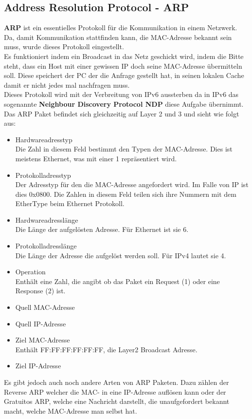 \documentclass[12pt,a4paper]{report}
\begin{document}
\subsection{Address Resolution Protocol - ARP}\label{ssec:arp}
\textbf{ARP} ist ein essentielles Protokoll für die Kommunikation in einem Netzwerk. Da, damit Kommunikation stattfinden kann, die MAC-Adresse bekannt sein muss, wurde dieses Protokoll eingestellt.\\
Es funktioniert indem ein Broadcast in das Netz geschickt wird, indem die Bitte steht, dass ein Host mit einer gewissen IP doch seine MAC-Adresse übermitteln soll. Diese speichert der PC der die Anfrage gestellt hat, in seinen lokalen Cache damit er nicht jedes mal nachfragen muss.\\
Dieses Protokoll wird mit der Verbreitung von IPv6 aussterben da in IPv6 das sogenannte \textbf{Neighbour Discovery Protocol NDP} diese Aufgabe übernimmt.\\

Das ARP Paket befindet sich gleichzeitig auf Layer 2 und 3 und sieht wie folgt aus:\\
\begin{itemize}
\item Hardwareadresstyp\\
Die Zahl in diesem Feld bestimmt den Typen der MAC-Adresse. Dies ist meistens Ethernet, was mit einer 1 repräsentiert wird.
\item Protokolladresstyp\\
Der Adresstyp für den die MAC-Adresse angefordert wird. Im Falle von IP ist dies 0x0800. Die Zahlen in diesem Feld teilen sich ihre Nummern mit dem EtherType beim Ethernet Protokoll.
\item Hardwareadresslänge\\
Die Länge der aufgelösten Adresse. Für Ethernet ist sie 6.
\item Protokolladresslänge\\
Die Länge der Adresse die aufgelöst werden soll. Für IPv4 lautet sie 4.
\item Operation\\
Enthält eine Zahl, die angibt ob das Paket ein Request (1) oder eine Response (2) ist.
\item Quell MAC-Adresse
\item Quell IP-Adresse
\item Ziel MAC-Adresse\\
Enthält FF:FF:FF:FF:FF:FF, die Layer2 Broadcast Adresse.
\item Ziel IP-Adresse
\end{itemize}
Es gibt jedoch auch noch andere Arten von ARP Paketen. Dazu zählen der Reverse ARP welcher die MAC- in eine IP-Adresse auflösen kann oder der Gratuitos ARP, welche eine Nachricht darstellt, die unaufgefordert bekannt macht, welche MAC-Adresse man selbst hat.
\end{document}
